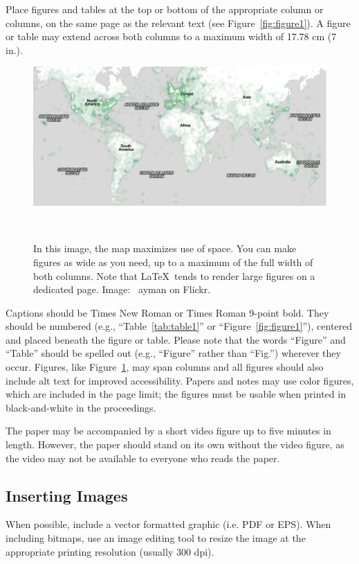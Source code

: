 \documentclass{sigchi}
\begin{document}
Place figures and tables at the top or bottom of the appropriate
column or columns, on the same page as the relevant text (see
Figure~\ref{fig:figure1}). A figure or table may extend across both
columns to a maximum width of 17.78 cm (7 in.).

\begin{figure}
  \centering
  \includegraphics[width=1.75\columnwidth]{figures/map}
  \caption{In this image, the map maximizes use of space. You can make
    figures as wide as you need, up to a maximum of the full width of
    both columns. Note that \LaTeX\ tends to render large figures on a
    dedicated page. Image: \ccbynd~ayman on
    Flickr.}~\label{fig:figure2}
\end{figure}

Captions should be Times New Roman or Times Roman 9-point bold.  They
should be numbered (e.g., ``Table~\ref{tab:table1}'' or
``Figure~\ref{fig:figure1}''), centered and placed beneath the figure
or table.  Please note that the words ``Figure'' and ``Table'' should
be spelled out (e.g., ``Figure'' rather than ``Fig.'') wherever they
occur. Figures, like Figure~\ref{fig:figure2}, may span columns and
all figures should also include alt text for improved accessibility.
Papers and notes may use color figures, which are included in the page
limit; the figures must be usable when printed in black-and-white in
the proceedings.

The paper may be accompanied by a short video figure up to five
minutes in length. However, the paper should stand on its own without
the video figure, as the video may not be available to everyone who
reads the paper.  

\subsection{Inserting Images}
When possible, include a vector formatted graphic (i.e. PDF or EPS).
When including bitmaps,  use an image editing tool to resize the image
at the appropriate printing resolution (usually 300 dpi).
\end{document}
